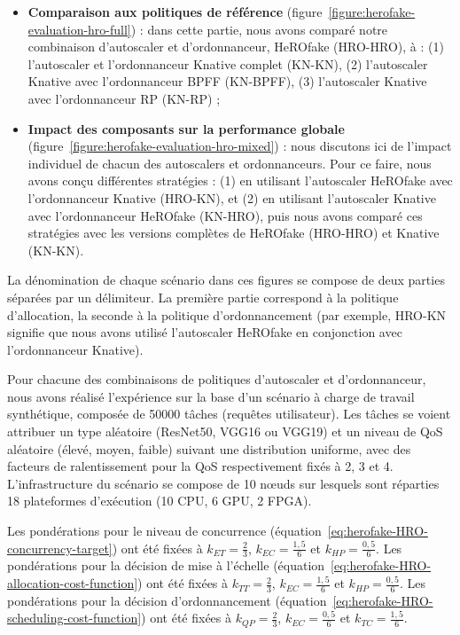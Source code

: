 \begin{itemize}
    \item \textbf{Comparaison aux politiques de référence} (figure~\ref{figure:herofake-evaluation-hro-full}) : dans cette partie, nous avons comparé notre combinaison d'autoscaler et d'ordonnanceur, HeROfake (HRO-HRO), à : (1) l'autoscaler et l'ordonnanceur Knative complet (KN-KN), (2) l'autoscaler Knative avec l'ordonnanceur BPFF (KN-BPFF), (3) l'autoscaler Knative avec l'ordonnanceur RP (KN-RP) ;
    \item \textbf{Impact des composants sur la performance globale} (figure~\ref{figure:herofake-evaluation-hro-mixed}) : nous discutons ici de l'impact individuel de chacun des autoscalers et ordonnanceurs. Pour ce faire, nous avons conçu différentes stratégies : (1) en utilisant l'autoscaler HeROfake avec l'ordonnanceur Knative (HRO-KN), et (2) en utilisant l'autoscaler Knative avec l'ordonnanceur HeROfake (KN-HRO), puis nous avons comparé ces stratégies avec les versions complètes de HeROfake (HRO-HRO) et Knative (KN-KN).
\end{itemize}

La dénomination de chaque scénario dans ces figures se compose de deux parties séparées par un délimiteur. La première partie correspond à la politique d'allocation, la seconde à la politique d'ordonnancement (par exemple, HRO-KN signifie que nous avons utilisé l'autoscaler HeROfake en conjonction avec l'ordonnanceur Knative).

Pour chacune des combinaisons de politiques d'autoscaler et d'ordonnanceur, nous avons réalisé l'expérience sur la base d'un scénario à charge de travail synthétique, composée de 50000 tâches (requêtes utilisateur). Les tâches se voient attribuer un type aléatoire (ResNet50, VGG16 ou VGG19) et un niveau de \gls{QoS} aléatoire (élevé, moyen, faible) suivant une distribution uniforme, avec des facteurs de ralentissement pour la \gls{QoS} respectivement fixés à 2, 3 et 4. L'infrastructure du scénario se compose de 10 nœuds sur lesquels sont réparties 18 plateformes d'exécution (10 \gls{CPU}, 6 \gls{GPU}, 2 \gls{FPGA}).

Les pondérations pour le niveau de concurrence (équation~\ref{eq:herofake-HRO-concurrency-target}) ont été fixées à $k_{ET} = \frac{2}{3}$, $k_{EC} = \frac{1,5}{6}$ et $k_{HP} = \frac{0,5}{6}$. Les pondérations pour la décision de mise à l'échelle (équation~\ref{eq:herofake-HRO-allocation-cost-function}) ont été fixées à $k_{TT} = \frac{2}{3}$, $k_{EC} = \frac{1,5}{6}$ et $k_{HP} = \frac{0,5}{6}$. Les pondérations pour la décision d'ordonnancement (équation~\ref{eq:herofake-HRO-scheduling-cost-function}) ont été fixées à $k_{QP} = \frac{2}{3}$, $k_{EC} = \frac{0,5}{6}$ et $k_{TC} = \frac{1,5}{6}$.

